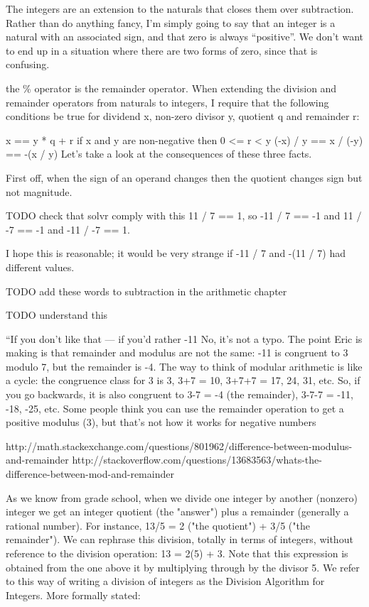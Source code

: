 The integers are an extension to the naturals that closes them over subtraction. Rather than do anything fancy, I’m simply going to say that an integer is a natural with an associated sign, and that zero is always “positive”. We don’t want to end up in a situation where there are two forms of zero, since that is confusing. 

the \% operator is the remainder operator. When extending the division and remainder operators from naturals to integers, I require that the following conditions be true for dividend x, non-zero divisor y, quotient q and remainder r:

x == y * q + r
if x and y are non-negative then 0 <= r < y
(-x) / y == x / (-y) == -(x / y)
Let’s take a look at the consequences of these three facts.

First off, when the sign of an operand changes then the quotient changes sign but not magnitude.

TODO check that solvr comply with this
11 / 7 == 1, so -11 / 7 == -1 and 11 / -7 == -1 and -11 / -7 == 1.

I hope this is reasonable; it would be very strange if -11 / 7 and -(11 / 7) had different values.

TODO add these words to subtraction in the arithmetic chapter

TODO understand this

“If you don’t like that — if you’d rather -11 %
No, it’s not a typo. The point Eric is making is that remainder and modulus are not the same: -11 is congruent to 3 modulo 7, but the remainder is -4. The way to think of modular arithmetic is like a cycle: the congruence class for 3 is 3, 3+7 = 10, 3+7+7 = 17, 24, 31, etc. So, if you go backwards, it is also congruent to 3-7 = -4 (the remainder), 3-7-7 = -11, -18, -25, etc. Some people think you can use the remainder operation to get a positive modulus (3), but that’s not how it works for negative numbers

http://math.stackexchange.com/questions/801962/difference-between-modulus-and-remainder
http://stackoverflow.com/questions/13683563/whats-the-difference-between-mod-and-remainder

As we know from grade school, when we divide one integer by another (nonzero) integer we get an integer quotient (the "answer") plus a remainder (generally a rational number). For instance,
13/5 = 2 ("the quotient") + 3/5 ("the remainder").
We can rephrase this division, totally in terms of integers, without reference to the division operation:
13 = 2(5) + 3.
Note that this expression is obtained from the one above it by multiplying through by the divisor 5.
We refer to this way of writing a division of integers as the Division Algorithm for Integers. More formally stated:

